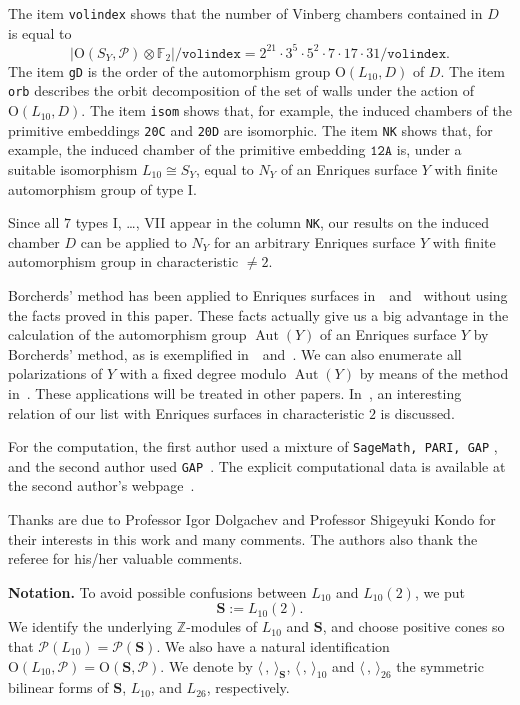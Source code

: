 \documentclass{amsart}
\numberwithin{equation}{section}
\numberwithin{table}{section}
\numberwithin{figure}{section}
\newcommand{\F}{\mathord{\mathbb F}}
\newcommand{\Z}{\mathord{\mathbb Z}}
\newcommand{\PPP}{\mathord{\mathcal P}}
\newcommand{\tensor}{\otimes}
\newcommand{\OG}{\mathord{\mathrm{O}}}
\newcommand{\Aut}{\operatorname{\mathrm{Aut}}\nolimits}
\newcommand{\intfS}[1]{\langle #1\rangle_{\SS}}
\newcommand{\intfL}[1]{\langle #1\rangle_{10}}
\newcommand{\intfLL}[1]{\langle #1\rangle_{26}}
\newcommand{\OGP}[1]{\OG(#1, \PPP)}
\newcommand{\oLtenFtwo}{{2}^{21} \cdot {3}^{5} \cdot {5}^{2} \cdot {7} \cdot {17} \cdot {31} }
\renewcommand{\SS}{\mathbf{S}}
\begin{document}
The item \texttt{volindex} shows that
the number of Vinberg chambers contained in $D$ is equal to
\[
|  \OGP{S_Y}\tensor \F_2|/\texttt{volindex}=\oLtenFtwo/\texttt{volindex}.
\]
The item \texttt{gD} is the order of the automorphism group $\OG(L_{10}, D)$ of $D$.
The item \texttt{orb} describes the orbit decomposition of the set of walls
under the action of $\OG(L_{10}, D)$.
The item \texttt{isom} shows that, for example,
the induced chambers of  the primitive embeddings \texttt{20C}
and \texttt{20D} are isomorphic.
The item \texttt{NK} shows that, for example,
the induced chamber of  the primitive embedding $\texttt{12A}$
is, under a suitable isomorphism $L_{10}\cong S_Y$,  equal to
 $N_{Y}$ of an Enriques surface $Y$ 
with finite automorphism group 
of type $\textrm{I}$.
%
\par
\medskip
Since all $7$ types \textrm{I}, \dots, \textrm{VII} appear in the column \texttt{NK},
our results on the induced chamber $D$ can be applied to $N_Y$
for an arbitrary Enriques surface $Y$ with finite automorphism group
in characteristic $\ne 2$.
\par
Borcherds' method has been applied to Enriques surfaces
in~\cite{Shimada2016}~and~\cite{ShimadaHessian}
without using the facts proved in this paper.
These facts actually give us a big advantage in
the calculation of the automorphism group $\Aut(Y)$
of an Enriques surface $Y$ by Borcherds' method,
as is exemplified 
in~\cite{BRS2019}~and~\cite{ShimadaVeniani2019}.
We can also enumerate all polarizations of $Y$ with a fixed degree
modulo $\Aut(Y)$ by means of the method in~\cite{ShimadaHoles}.
These applications will be treated in other papers.
In~\cite{DKbook}, 
an interesting relation of 
our list with Enriques surfaces in characteristic $2$ 
is discussed.
%
\par
For the computation, the first author used a mixture of {\tt SageMath, PARI, GAP} \cite{sagemath,PARI2,GAP},
and the second author used {\tt GAP}~\cite{GAP}.
The explicit computational data is available
at the second author's webpage~\cite{thecompdataL10L26}.
%
%
\par
Thanks are due to Professor Igor Dolgachev and Professor Shigeyuki Kondo
for their interests in this work and many comments.
The authors also thank the referee for his/her valuable comments.
%
%
\par
\medskip
{\bf Notation.}
To avoid possible confusions between $L_{10}$ and $L_{10}(2)$,
we put
\[
\SS:=L_{10}(2).
\]
We identify the underlying $\Z$-modules of $L_{10}$ and $\SS$, and
choose positive cones so that $\PPP(L_{10})=\PPP(\SS)$.
We also have a natural identification $\OGP{L_{10}}=\OGP{\SS}$.
We denote by $\intfS{\,,\,}$,  $\intfL{\,,\,}$ and $\intfLL{\,,\,}$
the symmetric bilinear forms of $\SS$,   $L_{10}$, and $L_{26}$, respectively.
%
%
\end{document}
